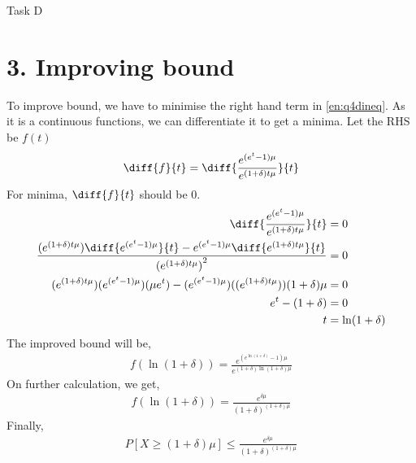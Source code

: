 \begin{task}{Task D}
	\section*{3. Improving bound}
	To improve bound, we have to minimise the right hand term in \ref{en:q4dineq}. As it is a continuous functions, we can differentiate it to get a minima. Let the RHS be $f(t)$
	\begin{align}
		\diff{f}{t} = \diff{\frac{e^{(e^t-1)\mu}}{e^{(1+\delta)t\mu}}}{t}
	\end{align}
	For minima, $\diff{f}{t} $ should be 0.
	\begin{align}
		\diff{\frac{e^{(e^t-1)\mu}}{e^{(1+\delta)t\mu}}}{t}                                                                       & = 0             \\
		\frac{(e^{(1+\delta)t\mu})\diff{e^{(e^t-1)\mu}}{t}- e^{(e^t-1)\mu}\diff{e^{(1+\delta)t\mu}}{t}}{{(e^{(1+\delta)t\mu})}^2} & = 0             \\
		(e^{(1+\delta)t\mu})(e^{(e^t-1)\mu})(\mu e^t) - (e^{(e^t-1)\mu})((e^{(1+\delta)t\mu}))(1+\delta)\mu                       & = 0             \\
		e^t - (1+\delta)                                                                                                          & = 0             \\
		t                                                                                                                         & = \ln(1+\delta)
	\end{align}
	The improved bound will be,
	\begin{align}
		f(\ln(1+\delta)) = \frac{e^{(e^{\ln(1+\delta)}-1)\mu}}{e^{(1+\delta){\ln(1+\delta)}\mu}}
	\end{align}
	On further calculation, we get,
	\begin{align}
		f(\ln(1+\delta)) = \frac{e^{\delta \mu}}{(1+\delta)^{(1+\delta)\mu}}
	\end{align}
	Finally,
	\begin{align}
		P[X\geq (1+\delta)\mu] \leq \frac{e^{\delta \mu}}{(1+\delta)^{(1+\delta)\mu}}
	\end{align}
    \end{task}


